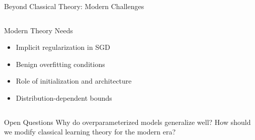 \documentclass[aspectratio=169,11pt]{beamer}
\begin{document}
\begin{frame}{Beyond Classical Theory: Modern Challenges}
\begin{columns}
\begin{column}{0.5\textwidth}
\begin{block}{Modern Theory Needs}
\begin{itemize}
\item Implicit regularization in SGD
\item Benign overfitting conditions
\item Role of initialization and architecture
\item Distribution-dependent bounds
\end{itemize}
\end{block}
\end{column}
\end{columns}

\begin{alertblock}{Open Questions}
Why do overparameterized models generalize well? How should we modify classical learning theory for the modern era?
\end{alertblock}
\end{frame}
\end{document}
